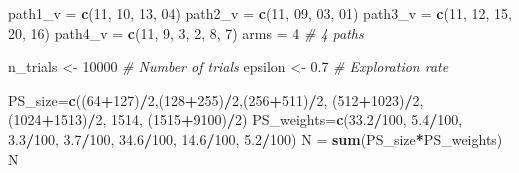 \documentclass[
]{article}
\newenvironment{Shaded}{\begin{snugshade}}{\end{snugshade}}
\newcommand{\CommentTok}[1]{\textcolor[rgb]{0.56,0.35,0.01}{\textit{#1}}}
\newcommand{\DecValTok}[1]{\textcolor[rgb]{0.00,0.00,0.81}{#1}}
\newcommand{\FloatTok}[1]{\textcolor[rgb]{0.00,0.00,0.81}{#1}}
\newcommand{\FunctionTok}[1]{\textcolor[rgb]{0.13,0.29,0.53}{\textbf{#1}}}
\newcommand{\NormalTok}[1]{#1}
\newcommand{\OtherTok}[1]{\textcolor[rgb]{0.56,0.35,0.01}{#1}}
\newcommand{\SpecialCharTok}[1]{\textcolor[rgb]{0.81,0.36,0.00}{\textbf{#1}}}
\begin{document}
\begin{Shaded}
\begin{Highlighting}[]
\NormalTok{path1\_v }\OtherTok{=} \FunctionTok{c}\NormalTok{(}\DecValTok{11}\NormalTok{, }\DecValTok{10}\NormalTok{, }\DecValTok{13}\NormalTok{, }\DecValTok{04}\NormalTok{) }
\NormalTok{path2\_v }\OtherTok{=} \FunctionTok{c}\NormalTok{(}\DecValTok{11}\NormalTok{, }\DecValTok{09}\NormalTok{, }\DecValTok{03}\NormalTok{, }\DecValTok{01}\NormalTok{)  }
\NormalTok{path3\_v }\OtherTok{=} \FunctionTok{c}\NormalTok{(}\DecValTok{11}\NormalTok{, }\DecValTok{12}\NormalTok{, }\DecValTok{15}\NormalTok{, }\DecValTok{20}\NormalTok{, }\DecValTok{16}\NormalTok{)}
\NormalTok{path4\_v }\OtherTok{=} \FunctionTok{c}\NormalTok{(}\DecValTok{11}\NormalTok{, }\DecValTok{9}\NormalTok{, }\DecValTok{3}\NormalTok{, }\DecValTok{2}\NormalTok{, }\DecValTok{8}\NormalTok{, }\DecValTok{7}\NormalTok{) }
\NormalTok{arms }\OtherTok{=} \DecValTok{4} \CommentTok{\# 4 paths}

\NormalTok{n\_trials }\OtherTok{\textless{}{-}} \DecValTok{10000} \CommentTok{\# Number of trials}
\NormalTok{epsilon }\OtherTok{\textless{}{-}} \FloatTok{0.7} \CommentTok{\# Exploration rate}

\NormalTok{PS\_size}\OtherTok{=}\FunctionTok{c}\NormalTok{((}\DecValTok{64}\SpecialCharTok{+}\DecValTok{127}\NormalTok{)}\SpecialCharTok{/}\DecValTok{2}\NormalTok{,(}\DecValTok{128}\SpecialCharTok{+}\DecValTok{255}\NormalTok{)}\SpecialCharTok{/}\DecValTok{2}\NormalTok{,(}\DecValTok{256}\SpecialCharTok{+}\DecValTok{511}\NormalTok{)}\SpecialCharTok{/}\DecValTok{2}\NormalTok{, (}\DecValTok{512}\SpecialCharTok{+}\DecValTok{1023}\NormalTok{)}\SpecialCharTok{/}\DecValTok{2}\NormalTok{, (}\DecValTok{1024}\SpecialCharTok{+}\DecValTok{1513}\NormalTok{)}\SpecialCharTok{/}\DecValTok{2}\NormalTok{, }\DecValTok{1514}\NormalTok{, (}\DecValTok{1515}\SpecialCharTok{+}\DecValTok{9100}\NormalTok{)}\SpecialCharTok{/}\DecValTok{2}\NormalTok{)}
\NormalTok{PS\_weights}\OtherTok{=}\FunctionTok{c}\NormalTok{(}\FloatTok{33.2}\SpecialCharTok{/}\DecValTok{100}\NormalTok{, }\FloatTok{5.4}\SpecialCharTok{/}\DecValTok{100}\NormalTok{, }\FloatTok{3.3}\SpecialCharTok{/}\DecValTok{100}\NormalTok{, }\FloatTok{3.7}\SpecialCharTok{/}\DecValTok{100}\NormalTok{, }\FloatTok{34.6}\SpecialCharTok{/}\DecValTok{100}\NormalTok{, }\FloatTok{14.6}\SpecialCharTok{/}\DecValTok{100}\NormalTok{, }\FloatTok{5.2}\SpecialCharTok{/}\DecValTok{100}\NormalTok{)}
\NormalTok{N }\OtherTok{=} \FunctionTok{sum}\NormalTok{(PS\_size}\SpecialCharTok{*}\NormalTok{PS\_weights)}
\NormalTok{N}
\end{Highlighting}
\end{Shaded}
\end{document}
